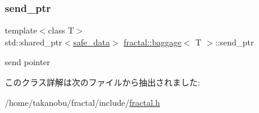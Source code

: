 \mbox{\label{classfractal_1_1baggage_aff8cc1cd923c97ecc18b7b574889ca63}} 
\subsubsection{\texorpdfstring{send\+\_\+ptr}{send\_ptr}}
{\footnotesize\ttfamily template$<$class T$>$ \\
std\+::shared\+\_\+ptr$<$\hyperlink{structfractal_1_1baggage_1_1safe__data}{safe\+\_\+data}$>$ \hyperlink{classfractal_1_1baggage}{fractal\+::baggage}$<$ T $>$\+::send\+\_\+ptr\hspace{0.3cm}{\ttfamily [private]}}



send pointer 



このクラス詳解は次のファイルから抽出されました\+:\begin{DoxyCompactItemize}
\item 
/home/takanobu/fractal/include/\hyperlink{fractal_8h}{fractal.\+h}\end{DoxyCompactItemize}
